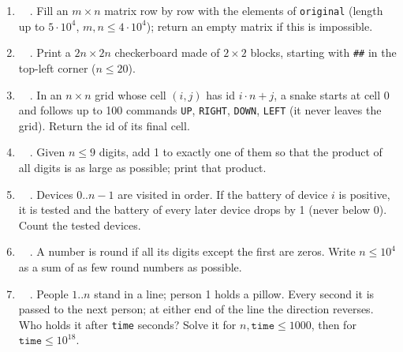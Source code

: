 \exlegend
\begin{enumerate}[leftmargin=*, label=\textbf{E4.\arabic*}, itemsep=6pt]
    \item \exeasy\ \pconcept {}\ . Fill an $m \times n$ matrix row by row with the elements of \texttt{original} (length up to $5\cdot10^4$, $m, n \le 4\cdot10^4$); return an empty matrix if this is impossible.
    \item \exeasy\ \pconcept {}\ . Print a $2n \times 2n$ checkerboard made of $2 \times 2$ blocks, starting with \texttt{\#\#} in the top-left corner ($n \le 20$).
    \item \exeasy\ \precent {}\ . In an $n \times n$ grid whose cell $(i,j)$ has id $i\cdot n + j$, a snake starts at cell 0 and follows up to 100 commands \texttt{UP}, \texttt{RIGHT}, \texttt{DOWN}, \texttt{LEFT} (it never leaves the grid). Return the id of its final cell.
    \item \exeasy\ \ptricky {}\ . Given $n \le 9$ digits, add 1 to exactly one of them so that the product of all digits is as large as possible; print that product.
    \item \exeasy\ \precent {}\ . Devices $0..n-1$ are visited in order. If the battery of device $i$ is positive, it is tested and the battery of every later device drops by 1 (never below 0). Count the tested devices.
    \item \exeasy\ \pclassic {}\ . A number is round if all its digits except the first are zeros. Write $n \le 10^4$ as a sum of as few round numbers as possible.
    \item \exeasy\ \ptricky {}\ . People $1..n$ stand in a line; person 1 holds a pillow. Every second it is passed to the next person; at either end of the line the direction reverses. Who holds it after \texttt{time} seconds? Solve it for $n, \texttt{time} \le 1000$, then for $\texttt{time} \le 10^{18}$.
\end{enumerate}

